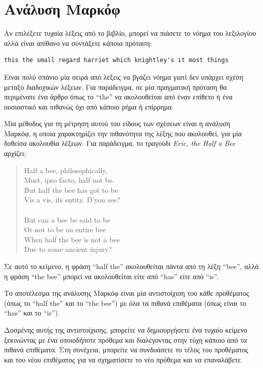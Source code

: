 \documentclass[10pt]{book}
\begin{document}
 
\section{Ανάλυση Μαρκόφ}
\label{markov}

Αν επιλέξετε τυχαία λέξεις από το βιβλίο, μπορεί να πιάσετε το νόημα του λεξιλογίου αλλά είναι απίθανο να συντάξετε κάποια πρόταση:

\begin{verbatim}
this the small regard harriet which knightley's it most things
\end{verbatim}
%
Είναι πολύ σπάνιο μία σειρά από λέξεις να βγάζει νόημα γιατί δεν υπάρχει σχέση μεταξύ διαδοχικών λέξεων. Για παράδειγμα, σε μία πραγματική πρόταση θα περιμένατε ένα άρθρο όπως το ``the'' να ακολουθείται από έναν επίθετο ή ένα ουσιαστικό και πιθανώς όχι από κάποιο ρήμα ή επίρρημα.

Μία μέθοδος για τη μέτρηση αυτού του είδους των σχέσεων είναι η ανάλυση Μαρκόφ, η οποία χαρακτηρίζει την πιθανότητα της λέξης που ακολουθεί, για μία δοθείσα ακολουθία λέξεων. Για παράδειγμα, το τραγούδι {\em Eric, the Half a Bee} αρχίζει:

\begin{quote}
Half a bee, philosophically, \\
Must, ipso facto, half not be. \\
But half the bee has got to be \\
Vis a vis, its entity. D'you see? \\
\\
But can a bee be said to be \\
Or not to be an entire bee \\
When half the bee is not a bee \\
Due to some ancient injury? \\
\end{quote}
%
Σε αυτό το κείμενο, η φράση ``half the'' ακολουθείται πάντα από τη λέξη ``bee'', αλλά η φράση ``the bee''  μπορεί να ακολουθείται είτε από ``has'' είτε από ``is''.

Το αποτέλεσμα της ανάλυσης Μαρκόφ είναι μία αντιστοίχιση του κάθε προθέματος (όπως το ``half the'' και το ``the bee'') με όλα τα πιθανά επιθέματα (όπως είναι το ``has'' και το ``is'').

Δοσμένης αυτής της αντιστοίχισης, μπορείτε να δημιουργήσετε ένα τυχαίο κείμενο ξεκινώντας με ένα οποιοδήποτε πρόθεμα και διαλέγοντας στην τύχη κάποιο από τα πιθανά επιθέματα. Στη συνέχεια, μπορείτε να συνδυάσετε το τέλος του προθέματος και του νέου επιθέματος για να σχηματίσετε το νέο πρόθεμα και να επαναλάβετε.
\end{document}
